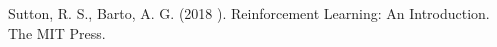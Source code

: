 \documentclass[conference]{IEEEtran}
\begin{document}






\begin{thebibliography}{00}
 Sutton, R. S., Barto, A. G. (2018 ). Reinforcement Learning: An Introduction. The MIT Press.
\end{thebibliography}

\end{document}
